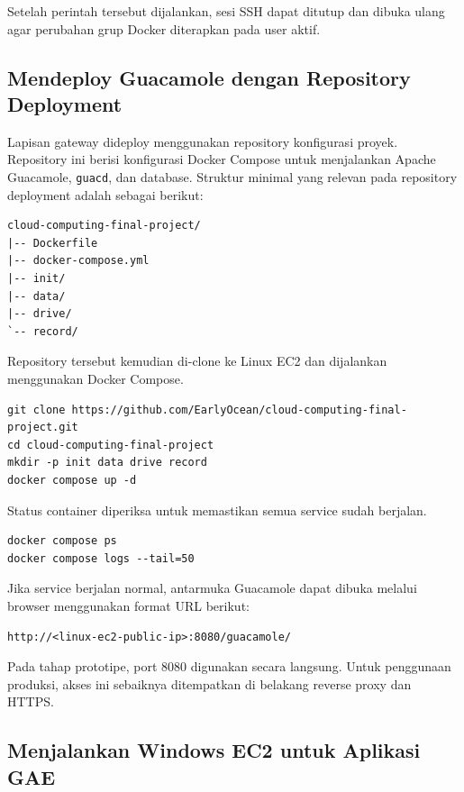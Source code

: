 \documentclass[conference]{IEEEtran}
\begin{document}
Setelah perintah tersebut dijalankan, sesi SSH dapat ditutup dan dibuka ulang agar perubahan grup Docker diterapkan pada user aktif.

\subsection{Mendeploy Guacamole dengan Repository Deployment}

Lapisan gateway dideploy menggunakan repository konfigurasi proyek. Repository ini berisi konfigurasi Docker Compose untuk menjalankan Apache Guacamole, \texttt{guacd}, dan database. Struktur minimal yang relevan pada repository deployment adalah sebagai berikut:

\begin{lstlisting}[style=code]
cloud-computing-final-project/
|-- Dockerfile
|-- docker-compose.yml
|-- init/
|-- data/
|-- drive/
`-- record/
\end{lstlisting}

Repository tersebut kemudian di-clone ke Linux EC2 dan dijalankan menggunakan Docker Compose.

\begin{lstlisting}[style=code]
git clone https://github.com/EarlyOcean/cloud-computing-final-project.git
cd cloud-computing-final-project
mkdir -p init data drive record
docker compose up -d
\end{lstlisting}

Status container diperiksa untuk memastikan semua service sudah berjalan.

\begin{lstlisting}[style=code]
docker compose ps
docker compose logs --tail=50
\end{lstlisting}

Jika service berjalan normal, antarmuka Guacamole dapat dibuka melalui browser menggunakan format URL berikut:

\begin{lstlisting}[style=code]
http://<linux-ec2-public-ip>:8080/guacamole/
\end{lstlisting}

Pada tahap prototipe, port 8080 digunakan secara langsung. Untuk penggunaan produksi, akses ini sebaiknya ditempatkan di belakang reverse proxy dan HTTPS.

\subsection{Menjalankan Windows EC2 untuk Aplikasi GAE}
\end{document}

